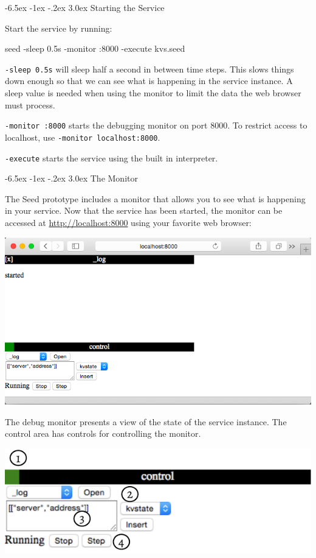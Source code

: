 \documentclass[a5paper,12pt,onecolumn]{article}
\makeatletter
\def\code#1{\mbox{\lstinline{#1}}}
\renewcommand\section{\@startsection {section}{1}{\z@}%
	{-6.5ex \@plus -1ex \@minus -.2ex}%
	{3.0ex}%
	{\sf\Large}}
\makeatother
\begin{document}
\section{Starting the Service}

Start the service by running:

\begin{cli}
seed -sleep 0.5s -monitor :8000 -execute kvs.seed
\end{cli}

\code{-sleep 0.5s} will sleep half a second in between time steps. This slows things down enough so that we can see what is happening in the service instance. A sleep value is needed when using the monitor to limit the data the web browser must process.

\code{-monitor :8000} starts the debugging monitor on port 8000. To restrict access to localhost, use \code{-monitor localhost:8000}.

\code{-execute} starts the service using the built in interpreter.

\section{The Monitor}

The Seed prototype includes a monitor that allows you to see what is happening in your service. Now that the service has been started, the monitor can be accessed at \url{http://localhost:8000} using your favorite web browser:

\includegraphics{start/monitor.png}

The debug monitor presents a view of the state of the service instance. The control area has controls for controlling the monitor.

\includegraphics{start/control}
\end{document}

